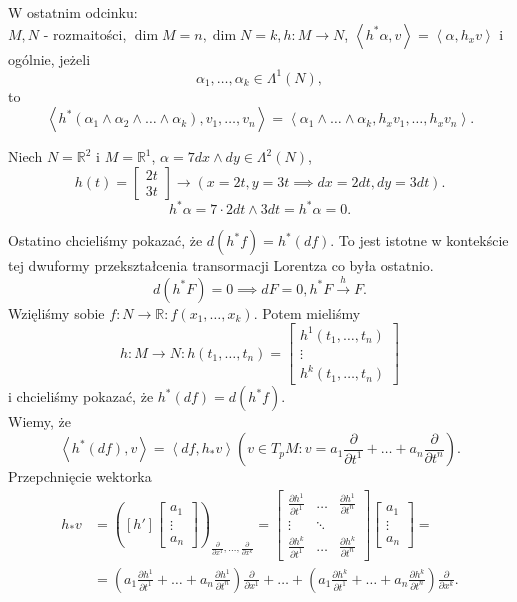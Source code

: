 \documentclass[../main.tex]{subfiles}
\begin{document}
    W ostatnim odcinku:\\
    $M, N$ - rozmaitości, $\dim M = n, \dim N = k, h: M\to N$, $\left<h^*\alpha,v \right> = \left<\alpha,h_xv \right>$ i ogólnie, jeżeli
    \[
        \alpha_1,\ldots,\alpha_k\in \Lambda^1(N)
    ,\]
to
\[
    \left< h^*(\alpha_1\land \alpha_2\land\ldots\land\alpha_k), v_1,\ldots,v_n\right> = \left<\alpha_1\land\ldots\land\alpha_k,h_xv_1,\ldots,h_xv_n \right>
    .\]

    \begin{przyklad}
        Niech $N = \mathbb{R}^2$ i $M = \mathbb{R}^1$, $\alpha = 7dx\land dy\in \Lambda^2(N)$, \\
        \[
            h(t) = \begin{bmatrix} 2t\\3t \end{bmatrix} \to (x = 2t, y = 3t \implies dx = 2dt, dy = 3dt)
        .\]
        \[
        h^*\alpha = 7\cdot 2dt\land 3dt = h^*\alpha = 0
        .\]
    \end{przyklad}
    Ostatino chcieliśmy pokazać, że $d(h^*f) = h^*(df)$. To jest istotne w kontekście tej dwuformy przekształcenia transormacji Lorentza co była ostatnio.
    \[
        d(h^*F) = 0 \implies dF = 0, h^*F \overset{h}{\to} F
    .\]
    Wzięliśmy sobie $f: N\to \mathbb{R}: f(x_1,\ldots,x_k)$. Potem mieliśmy
    \[
        h: M\to N: h(t_1,\ldots,t_n) = \begin{bmatrix} h^1(t_1,\ldots,t_n)\\ \vdots \\ h^k(t_1,\ldots,t_n) \end{bmatrix}
        \]
        i chcieliśmy pokazać, że $h^*(df) = d(h^*f)$. \\
Wiemy, że
\[
    \left<h^*(df),v \right> = \left<df,h_*v \right> (v\in T_pM: v = a_1 \frac{\partial }{\partial t^1} + \ldots + a_n \frac{\partial }{\partial t^n} )
    .\]
Przepchnięcie wektorka
\begin{align*}
    h_*v &= \left(\left[ h' \right] \begin{bmatrix} a_1\\ \vdots \\ a_n \end{bmatrix}\right)_{\frac{\partial }{\partial x^1} ,\ldots,\frac{\partial }{\partial x^k} } = \begin{bmatrix} \frac{\partial h^1}{\partial t^1} & \ldots & \frac{\partial h^1}{\partial t^n} \\ \vdots & \ddots & \\ \frac{\partial h^k}{\partial t^1} & \ldots & \frac{\partial h^k}{\partial t^n}  \end{bmatrix} \begin{bmatrix} a_1 \\ \vdots \\ a_n \end{bmatrix} = \\
        & = \left( a_1 \frac{\partial h^1}{\partial t^1} + \ldots + a_n \frac{\partial h^1}{\partial t^n}  \right) \frac{\partial }{\partial x^1} + \ldots + \left( a_1 \frac{\partial h^k}{\partial t^1} + \ldots + a_n \frac{\partial h^k}{\partial t^n} \right)\frac{\partial }{\partial x^k}
.\end{align*}
\end{document}
